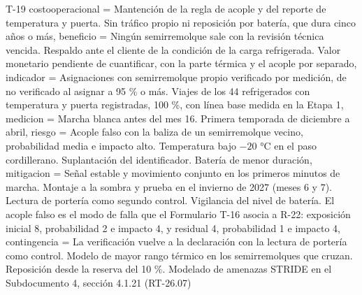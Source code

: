 \begin{formulario}{T-19}
{  costooperacional = {Mantención de la regla de acople y del reporte de temperatura y puerta. Sin tráfico propio ni reposición por batería, que dura cinco años o más},
  beneficio = {Ningún semirremolque sale con la revisión técnica vencida. Respaldo ante el cliente de la condición de la carga refrigerada. Valor monetario pendiente de cuantificar, con la parte térmica y el acople por separado},
  indicador = {Asignaciones con semirremolque propio verificado por medición, de no verificado al asignar a 95 \% o más. Viajes de los 44 refrigerados con temperatura y puerta registradas, 100 \%, con línea base medida en la Etapa 1},
  medicion = {Marcha blanca antes del mes 16. Primera temporada de diciembre a abril},
  riesgo = {Acople falso con la baliza de un semirremolque vecino, probabilidad media e impacto alto. Temperatura bajo $-20$ °C en el paso cordillerano. Suplantación del identificador. Batería de menor duración},
  mitigacion = {Señal estable y movimiento conjunto en los primeros minutos de marcha. Montaje a la sombra y prueba en el invierno de 2027 (meses 6 y 7). Lectura de portería como segundo control. Vigilancia del nivel de batería. El acople falso es el modo de falla que el Formulario T-16 asocia a R-22: exposición inicial 8, probabilidad 2 e impacto 4, y residual 4, probabilidad 1 e impacto 4},
  contingencia = {La verificación vuelve a la declaración con la lectura de portería como control. Modelo de mayor rango térmico en los semirremolques que cruzan. Reposición desde la reserva del 10 \%. Modelado de amenazas STRIDE en el Subdocumento 4, sección 4.1.21 (RT-26.07)}
}
\end{formulario}
